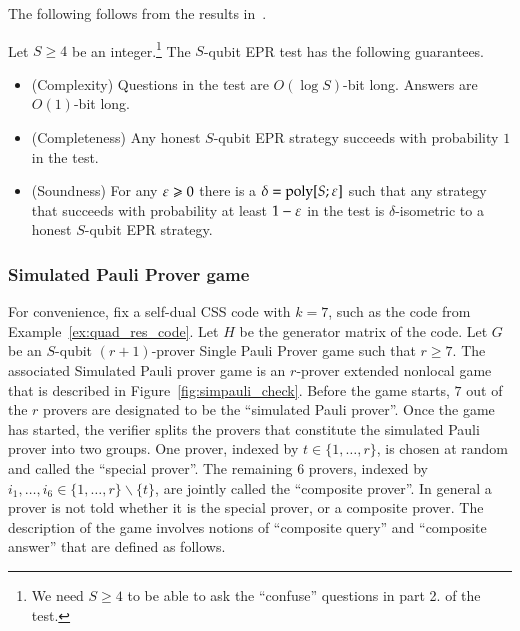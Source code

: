 The following follows from the results in~\cite{chao2016test}. 

\begin{theorem}\label{thm:epr-test}
Let $S \geq 4$ be an integer.\footnote{We need $S\geq 4$ to be able to ask the ``confuse'' questions in part 2. of the test.} The $S$-qubit EPR test has the following guarantees. 
\begin{itemize}
\item (Complexity) Questions in the test are $O(\log S)$-bit long. Answers are $O(1)$-bit long. 
\item (Completeness) Any honest $S$-qubit EPR strategy succeeds with probability $1$ in the test. 
\item (Soundness) For any $\varepsilon\geqslant 0$ there is a $\delta = \operatorname{poly}[S;\varepsilon]$ such that any strategy that succeeds with probability at least $1-\varepsilon$ in the test is $\delta$-isometric to a honest $S$-qubit EPR strategy. 
\end{itemize}
\end{theorem}


\subsubsection{Simulated Pauli Prover game}

For convenience, fix a self-dual CSS code with $k=7$, such as the code from Example~\ref{ex:quad_res_code}. Let $H$ be the generator matrix of the code. Let $G$ be an $S$-qubit $(r+1)$-prover Single Pauli Prover game such that $r\geq 7$. The associated Simulated Pauli prover game is an $r$-prover extended nonlocal game that is described in Figure~\ref{fig:simpauli_check}. Before the game starts, $7$ out of the $r$ provers are designated to be the ``simulated Pauli prover''. Once the game has started, the verifier splits the provers that constitute the simulated Pauli prover into two groups. One prover, indexed by $t\in\{1,\ldots, r\}$, is chosen
at random and called the ``special prover''. The remaining $6$ provers, indexed by $i_1,\ldots,i_6 \in \{1,\ldots,r\}\backslash\{t\}$, are
jointly called the ``composite prover''. In general a
prover is not told whether it is the special prover, or a composite prover. The description of the game involves notions of ``composite query'' and ``composite answer'' that are defined as follows.  

